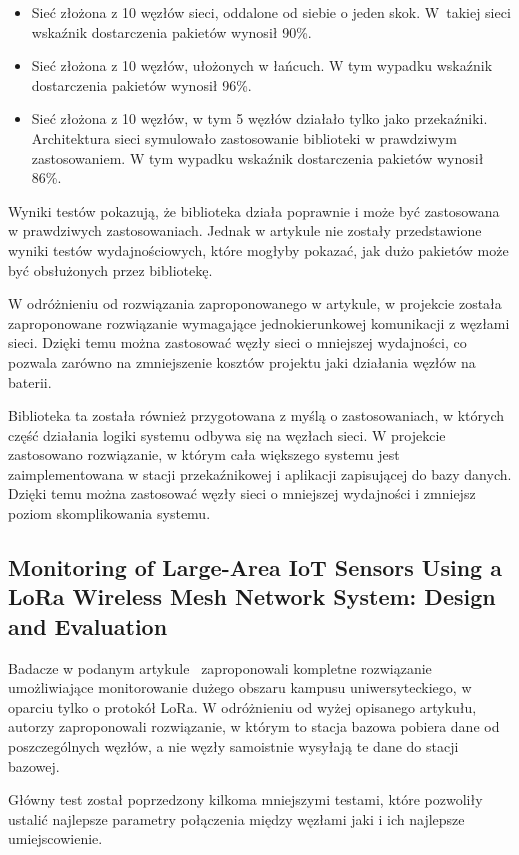 \begin{itemize}
    \item Sieć złożona z 10 węzłów sieci, oddalone od siebie o jeden skok. W~takiej sieci wskaźnik dostarczenia pakietów wynosił 90\%.
    \item Sieć złożona z 10 węzłów, ułożonych w łańcuch. W tym wypadku wskaźnik dostarczenia pakietów wynosił 96\%.
    \item Sieć złożona z 10 węzłów, w tym 5 węzłów działało tylko jako przekaźniki. Architektura sieci symulowało zastosowanie biblioteki w prawdziwym zastosowaniem. W tym wypadku wskaźnik dostarczenia pakietów wynosił 86\%.
\end{itemize}

Wyniki testów pokazują, że biblioteka działa poprawnie i może być zastosowana w prawdziwych zastosowaniach. Jednak w artykule nie zostały przedstawione wyniki testów wydajnościowych, które mogłyby pokazać, jak dużo pakietów może być obsłużonych przez bibliotekę.

W odróżnieniu od rozwiązania zaproponowanego w artykule, w projekcie została zaproponowane rozwiązanie wymagające jednokierunkowej komunikacji z węzłami sieci. Dzięki temu można zastosować węzły sieci o mniejszej wydajności, co pozwala zarówno na zmniejszenie kosztów projektu jaki działania węzłów na baterii.

Biblioteka ta została również przygotowana z myślą o zastosowaniach, w których część działania logiki systemu odbywa się na węzłach sieci. W projekcie zastosowano rozwiązanie, w którym cała większego systemu jest zaimplementowana w stacji przekaźnikowej i aplikacji zapisującej do bazy danych. Dzięki temu można zastosować węzły sieci o mniejszej wydajności i zmniejsz poziom skomplikowania systemu.

\subsection{Monitoring of Large-Area IoT Sensors Using a LoRa Wireless Mesh Network System: Design and Evaluation}

Badacze w podanym artykule~\cite{bib:loramesh-lee} zaproponowali kompletne rozwiązanie umożliwiające monitorowanie dużego obszaru kampusu uniwersyteckiego, w oparciu tylko o protokół LoRa. W odróżnieniu od wyżej opisanego artykułu, autorzy zaproponowali rozwiązanie, w którym to stacja bazowa pobiera dane od poszczególnych węzłów, a nie węzły samoistnie wysyłają te dane do stacji bazowej.

Główny test został poprzedzony kilkoma mniejszymi testami, które pozwoliły ustalić najlepsze parametry połączenia między węzłami jaki i ich najlepsze umiejscowienie.

